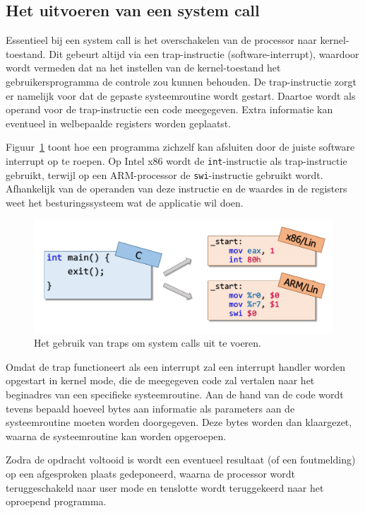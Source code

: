\subsection{Het uitvoeren van een system call}

Essentieel bij een system call is het overschakelen van de
processor naar kernel- toestand. Dit gebeurt altijd via een
trap-instructie (software-interrupt), waardoor wordt vermeden dat na
het instellen van de kernel-toestand het gebruikersprogramma de
controle zou kunnen behouden. De trap-instructie zorgt er namelijk
voor dat de gepaste systeemroutine wordt gestart. Daartoe wordt als
operand voor de trap-instructie een code meegegeven. Extra informatie kan
eventueel in welbepaalde registers worden geplaatst.

Figuur~\ref{fig:systemcalls} toont hoe een programma zichzelf kan afsluiten door
de juiste software interrupt op te roepen. Op Intel x86 wordt de \texttt{int}-instructie
als trap-instructie gebruikt, terwijl op een ARM-processor de \texttt{swi}-instructie
gebruikt wordt. Afhankelijk van de operanden van deze instructie en de waardes in de registers
weet het besturingssysteem wat de applicatie wil doen.

\begin{figure}
  \centering
  \includegraphics[scale=0.4]{images/IntInstructions.pdf}
  \caption{Het gebruik van traps om system calls uit te voeren.}\label{fig:systemcalls}
\end{figure}

Omdat de trap functioneert als een interrupt zal een interrupt
handler worden opgestart in kernel mode, die de meegegeven code zal
vertalen naar het beginadres van een specifieke systeemroutine. Aan de
hand van de code wordt tevens bepaald hoeveel bytes aan informatie als
parameters aan de systeemroutine moeten worden doorgegeven. Deze bytes
worden dan klaargezet, waarna de systeemroutine kan worden
opgeroepen.

Zodra de opdracht voltooid is wordt een eventueel resultaat (of
een foutmelding) op een afgesproken plaats gedeponeerd, waarna de
processor wordt teruggeschakeld naar user mode en tenslotte wordt
teruggekeerd naar het oproepend programma.

